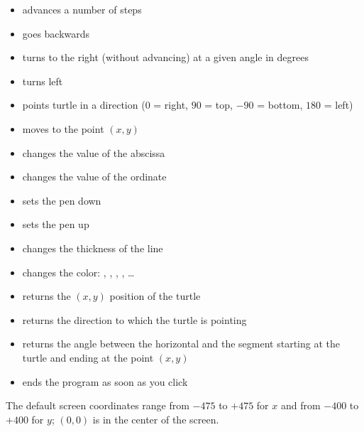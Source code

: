 \documentclass[11pt,class=report,crop=false]{standalone}
\begin{document}
\begin{cours}
\begin{itemize}
  \item {} advances a number of steps
  \item {} goes backwards
  \item {} turns to the right (without advancing) at a given angle in degrees
  \item {} turns left
  \item {} points turtle in a direction ($0$ = right, $90$ = top, $-90$ = bottom, $180$ = left)
  \item {} moves to the point $(x,y)$
  \item {} changes the value of the abscissa
  \item {} changes the value of the ordinate
  
  
  \item {} sets the pen down
  \item {} sets the pen up
  \item {} changes the thickness of the line
  \item {} changes the color: , , , , \ldots
  
  \item {} returns the $(x,y)$ position of the turtle
  \item {} returns the direction  to which the turtle is pointing
  \item {} returns the angle between the horizontal and the segment starting at the turtle and ending at the point $(x,y)$
  \item {} ends the program as soon as you click
\end{itemize}

The default screen coordinates range from $-475$ to $+475$ for $x$ and
from $-400$ to $+400$ for $y$; $(0,0)$ is in the center of the screen.


\end{cours}


\end{document}
